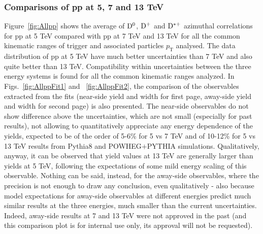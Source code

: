\subsubsection{Comparisons of pp at 5, 7 and 13 TeV}
Figure~\ref{fig:Allpp} shows the average of ${\rm D^0}$, ${\rm D^+}$ and ${\rm D^{*+}}$ azimuthal correlations for pp at 5 TeV compared with pp at 7 TeV and 13 TeV for all the common kinematic ranges of trigger and associated particles $p_\mathrm{T}$ analysed. The data distribution of pp at 5 TeV have much better uncertainties than 7 TeV and also quite better than 13 TeV. Compatibility within uncertainties between the three energy systems is found for all the common kinematic ranges analyzed. In Figs.~\ref{fig:AllppFit1} and ~\ref{fig:AllppFit2}, the comparison of the observables extracted from the fits (near-side yield and width for first page, away-side yield and width for second page) is also presented. The near-side observables do not show difference above the uncertainties, which are not small (especially for past results), not allowing to quantitatively appreciate any energy dependence of the yields, expected to be of the order of 5-6\% for 5 vs 7 TeV and of 10-12\% for 5 vs 13 TeV results from Pythia8 and POWHEG$+$PYTHIA simulations. Qualitatively, anyway, it can be observed that yield values at 13 TeV are generally larger than yields at 5 TeV, following the expectations of some mild energy scaling of this observable. Nothing can be said, instead, for the away-side observables, where the precision is not enough to draw any conclusion, even qualitatively - also because model expectations for away-side observables at different energies predict much similar results at the three energies, much smaller than the current uncertainties. Indeed, away-side results at 7 and 13 TeV were not approved in the past (and this comparison plot is for internal use only, its approval will not be requested).

